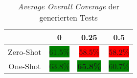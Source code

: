\bgroup
\def\arraystretch{2}
\begin{table}[H]
	\vspace{.5cm}
	\centering		
	\begin{center}
		\begin{tabular}{|c||c|c|c|}
			\hline 
			& 0 & 0.25 & 0.5 \\
			\hline 
			\hline
			Zero-Shot & \colorbox{green}{61.5\%} & \colorbox{red}{58.5\%} & \colorbox{red}{58.2\%} \\
			\hline
			One-Shot & \colorbox{green}{63.8\%} & \colorbox{green}{\textbf{65.8\%}} & \colorbox{green}{60.7\%} \\
			\hline
		\end{tabular} 
	\end{center}
	\caption{\textit{Average Overall Coverage} der generierten Tests}
	\label{fig:o-avg}
	\vspace{-.8cm}
\end{table}
\egroup